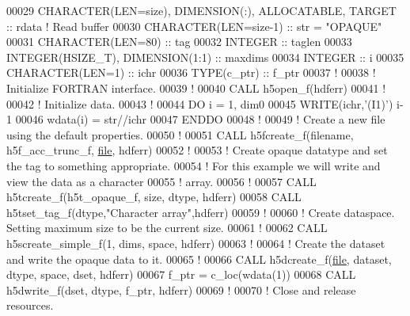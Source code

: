\begin{DoxyCode}
00029   \textcolor{keywordtype}{CHARACTER(LEN=size)}, \textcolor{keywordtype}{DIMENSION(:)}, \textcolor{keywordtype}{ALLOCATABLE}, \textcolor{keywordtype}{TARGET} :: rdata \textcolor{comment}{! Read buffer}
00030   \textcolor{keywordtype}{CHARACTER(LEN=size-1)} :: str = \textcolor{stringliteral}{"OPAQUE"}
00031   \textcolor{keywordtype}{CHARACTER(LEN=80)} :: tag
00032   \textcolor{keywordtype}{INTEGER} :: taglen
00033   \textcolor{keywordtype}{INTEGER(HSIZE\_T)}, \textcolor{keywordtype}{DIMENSION(1:1)} :: maxdims
00034   \textcolor{keywordtype}{INTEGER} :: i
00035   \textcolor{keywordtype}{CHARACTER(LEN=1)} :: ichr
00036   \textcolor{keywordtype}{TYPE}(c\_ptr) :: f\_ptr
00037   \textcolor{comment}{!}
00038   \textcolor{comment}{! Initialize FORTRAN interface.}
00039   \textcolor{comment}{!}
00040   \textcolor{keyword}{CALL }h5open\_f(hdferr)
00041   \textcolor{comment}{!}
00042   \textcolor{comment}{! Initialize data.}
00043   \textcolor{comment}{!}
00044   \textcolor{keywordflow}{DO} i = 1, dim0
00045      \textcolor{keyword}{WRITE}(ichr,\textcolor{stringliteral}{'(I1)'}) i-1 
00046      wdata(i) = str//ichr
00047 \textcolor{keywordflow}{  ENDDO}
00048   \textcolor{comment}{!}
00049   \textcolor{comment}{! Create a new file using the default properties.}
00050   \textcolor{comment}{!}
00051   \textcolor{keyword}{CALL }h5fcreate\_f(filename, h5f\_acc\_trunc\_f, \hyperlink{structfile}{file}, hdferr)
00052   \textcolor{comment}{!}
00053   \textcolor{comment}{! Create opaque datatype and set the tag to something appropriate.}
00054   \textcolor{comment}{! For this example we will write and view the data as a character}
00055   \textcolor{comment}{! array.}
00056   \textcolor{comment}{!}
00057   \textcolor{keyword}{CALL }h5tcreate\_f(h5t\_opaque\_f, \textcolor{keyword}{size}, dtype, hdferr)
00058   \textcolor{keyword}{CALL }h5tset\_tag\_f(dtype,\textcolor{stringliteral}{"Character array"},hdferr)
00059   \textcolor{comment}{!}
00060   \textcolor{comment}{! Create dataspace.  Setting maximum size to be the current size.}
00061   \textcolor{comment}{!}
00062   \textcolor{keyword}{CALL }h5screate\_simple\_f(1, dims, space, hdferr)
00063   \textcolor{comment}{!}
00064   \textcolor{comment}{! Create the dataset and write the opaque data to it.}
00065   \textcolor{comment}{!}
00066   \textcolor{keyword}{CALL }h5dcreate\_f(\hyperlink{structfile}{file}, dataset, dtype, space, dset, hdferr)
00067   f\_ptr = c\_loc(wdata(1))
00068   \textcolor{keyword}{CALL }h5dwrite\_f(dset, dtype, f\_ptr, hdferr)
00069   \textcolor{comment}{!}
00070   \textcolor{comment}{! Close and release resources.}

\end{DoxyCode}

